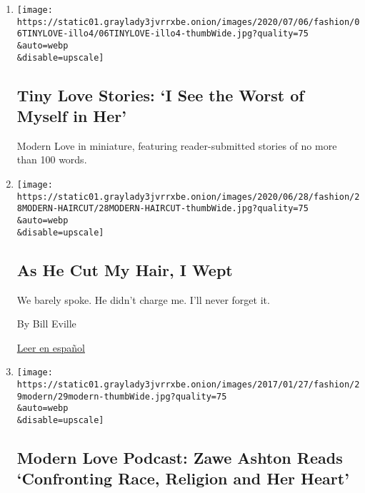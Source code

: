 \begin{enumerate}
\def\labelenumi{\arabic{enumi}.}
\item
  \href{/2020/06/30/style/tiny-modern-love-stories-coronavirus-i-see-the-worst-of-myself-in-her.html}{}

  \texttt{[image: https://static01.graylady3jvrrxbe.onion/images/2020/07/06/fashion/06TINYLOVE-illo4/06TINYLOVE-illo4-thumbWide.jpg?quality=75\\\&auto=webp\\\&disable=upscale]}

  \hypertarget{tiny-love-stories-i-see-the-worst-of-myself-in-her}{%
  \subsection{Tiny Love Stories: `I See the Worst of Myself in
  Her'}\label{tiny-love-stories-i-see-the-worst-of-myself-in-her}}

  Modern Love in miniature, featuring reader-submitted stories of no
  more than 100 words.
\item
  \href{/2020/06/26/style/modern-love-coronavirus-as-he-cut-my-hair-i-wept.html}{}

  \texttt{[image: https://static01.graylady3jvrrxbe.onion/images/2020/06/28/fashion/28MODERN-HAIRCUT/28MODERN-HAIRCUT-thumbWide.jpg?quality=75\\\&auto=webp\\\&disable=upscale]}

  \hypertarget{as-he-cut-my-hair-i-wept}{%
  \subsection{As He Cut My Hair, I
  Wept}\label{as-he-cut-my-hair-i-wept}}

  We barely spoke. He didn't charge me. I'll never forget it.

  By Bill Eville

  \href{https://www.nytimes3xbfgragh.onion/es/2020/07/05/espanol/estilos-de-vida/cancer-cabello.html}{Leer
  en español}
\item
  \href{/2020/06/24/style/modern-love-podcast-zawe-ashton.html}{}

  \texttt{[image: https://static01.graylady3jvrrxbe.onion/images/2017/01/27/fashion/29modern/29modern-thumbWide.jpg?quality=75\\\&auto=webp\\\&disable=upscale]}

  \hypertarget{modern-love-podcast-zawe-ashton-reads-confronting-race-religion-and-her-heart}{%
  \subsection{Modern Love Podcast: Zawe Ashton Reads `Confronting Race,
  Religion and Her
  Heart'}\label{modern-love-podcast-zawe-ashton-reads-confronting-race-religion-and-her-heart}}


\end{enumerate}
